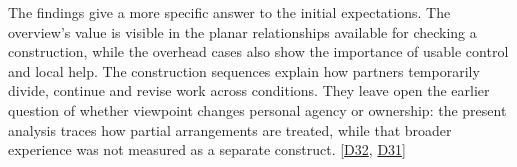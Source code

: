 The findings give a more specific answer to the initial expectations. The overview's value is visible in the planar relationships available for checking a construction, while the overhead cases also show the importance of usable control and local help. The construction sequences explain how partners temporarily divide, continue and revise work across conditions. They leave open the earlier question of whether viewpoint changes personal agency or ownership: the present analysis traces how partial arrangements are treated, while that broader experience was not measured as a separate construct. [\hyperlink{src:D32}{D32}, \hyperlink{src:D31}{D31}]
